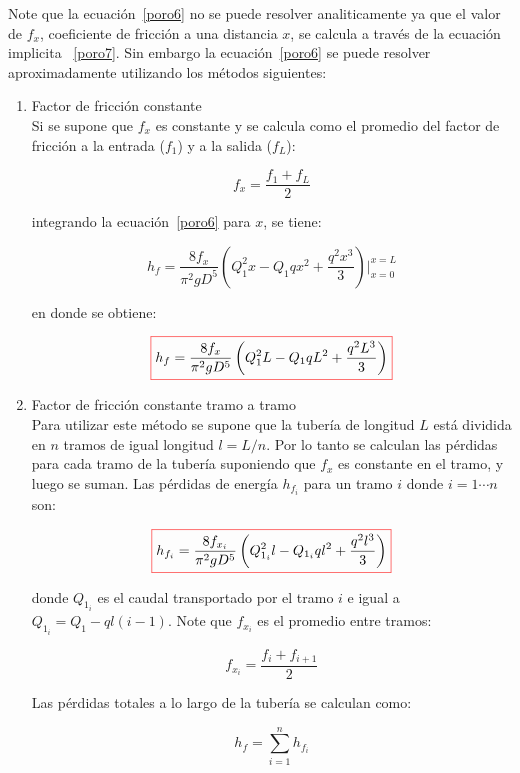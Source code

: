 \documentclass[10pt, oneside]{article}
\begin{document}
\begin{itemize}
Note que la ecuaci\'on~\ref{poro6} no se puede resolver analiticamente ya que el valor de $f_x$, coeficiente de fricci\'on a una distancia $x$, se calcula a trav\'es de la ecuaci\'on implicita ~\ref{poro7}. Sin embargo la ecuaci\'on~\ref{poro6} se puede resolver aproximadamente utilizando los m\'etodos siguientes:

\begin{enumerate}
\item Factor de fricci\'on constante\\
Si se supone que $f_x$ es constante y se calcula como el promedio del factor de fricci\'on a la entrada ($f_1$) y a la salida ($f_L$):

\begin{equation}
f_x = \frac{f_1 + f_L}{2}
\label{poro8}
\end{equation}

integrando la ecuaci\'on~\ref{poro6} para $x$, se tiene:

\begin{equation}
 h_f = \frac{8 f_x}{\pi^2 g D^5} \left( Q_1^2 x - Q_1 q x^2  + \frac{q^2 x^3 }{3} \right) \Bigg|_{x=0}^{x=L}
\label{poro9}
\end{equation}

en donde se obtiene:

\begin{equation}
\color{red}\boxed{\color{black} h_f = \frac{8 f_x}{\pi^2 g D^5} \left( Q_1^2 L - Q_1 q L^2  + \frac{q^2 L^3 }{3} \right) }
\label{poro10}
\end{equation}

\item Factor de fricci\'on constante tramo a tramo\\
Para utilizar este m\'etodo se supone que la tuber\'ia de longitud $L$ est\'a dividida en $n$ tramos de igual longitud $l=L/n$. Por lo tanto se calculan las p\'erdidas para cada tramo de la tuber\'ia suponiendo que $f_x$ es constante en el tramo, y luego se suman. Las p\'erdidas de energ\'ia $h_{f_i}$ para un tramo $i$ donde $i=1 \cdots n$ son:

\begin{equation}
\color{red}\boxed{\color{black} h_{f_i} = \frac{8 f_{x_i}}{\pi^2 g D^5} \left( Q_{1_i}^2 l - Q_{1_i} q l^2  + \frac{q^2 l^3 }{3} \right) }
\label{poro11}
\end{equation}

donde $Q_{1_i}$ es el caudal transportado por el tramo $i$ e igual a $Q_{1_i} = Q_1 - ql(i-1)$. Note que $f_{x_i}$ es el promedio entre tramos:

\begin{equation}
f_{x_i} = \frac{f_i + f_{i+1}}{2}
\label{poro12}
\end{equation}

Las p\'erdidas totales a lo largo de la tuber\'ia se calculan como:

\begin{equation}
h_f = \sum_{i=1}^{n} h_{f_i}
\label{poro13}
\end{equation}

\end{enumerate}
\end{itemize}
\end{document}

